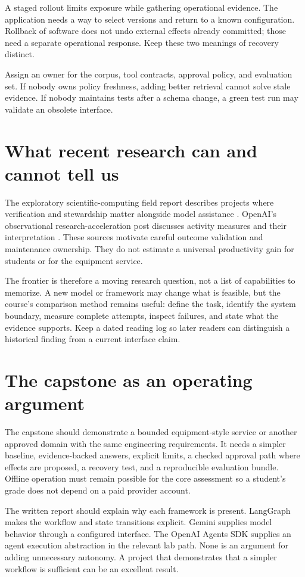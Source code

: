 A staged rollout limits exposure while gathering operational evidence. The application needs a way to select versions and return to a known configuration. Rollback of software does not undo external effects already committed; those need a separate operational response. Keep these two meanings of recovery distinct.

Assign an owner for the corpus, tool contracts, approval policy, and evaluation set. If nobody owns policy freshness, adding better retrieval cannot solve stale evidence. If nobody maintains tests after a schema change, a green test run may validate an obsolete interface.

\section{What recent research can and cannot tell us}
The exploratory scientific-computing field report describes projects where verification and stewardship matter alongside model assistance \cite{scientific-report}. OpenAI's observational research-acceleration post discusses activity measures and their interpretation \cite{acceleration-report}. These sources motivate careful outcome validation and maintenance ownership. They do not estimate a universal productivity gain for students or for the equipment service.

The frontier is therefore a moving research question, not a list of capabilities to memorize. A new model or framework may change what is feasible, but the course's comparison method remains useful: define the task, identify the system boundary, measure complete attempts, inspect failures, and state what the evidence supports. Keep a dated reading log so later readers can distinguish a historical finding from a current interface claim.

\section{The capstone as an operating argument}
The capstone should demonstrate a bounded equipment-style service or another approved domain with the same engineering requirements. It needs a simpler baseline, evidence-backed answers, explicit limits, a checked approval path where effects are proposed, a recovery test, and a reproducible evaluation bundle. Offline operation must remain possible for the core assessment so a student's grade does not depend on a paid provider account.

The written report should explain why each framework is present. LangGraph makes the workflow and state transitions explicit. Gemini supplies model behavior through a configured interface. The OpenAI Agents SDK supplies an agent execution abstraction in the relevant lab path. None is an argument for adding unnecessary autonomy. A project that demonstrates that a simpler workflow is sufficient can be an excellent result.

